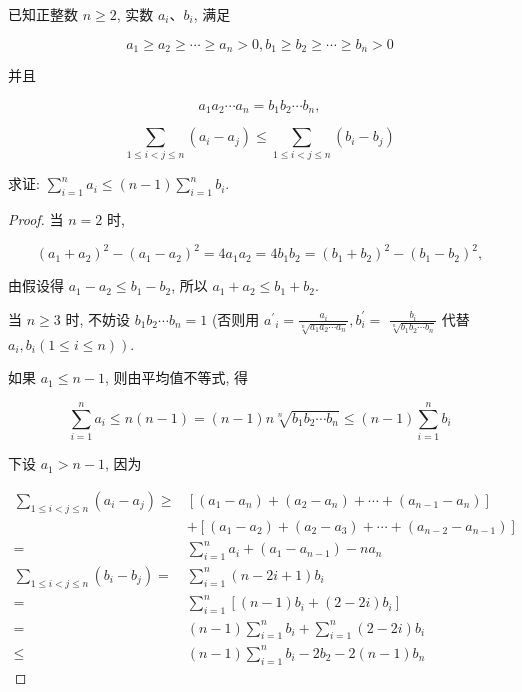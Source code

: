 \begin{example}
	已知正整数 $n \geqslant 2$, 实数 $a_{i} 、 b_{i}$, 满足
	
	$$
	a_{1} \geqslant a_{2} \geqslant \cdots \geqslant a_{n}>0, b_{1} \geqslant b_{2} \geqslant \cdots \geqslant b_{n}>0
	$$
	
	并且
	
	$$
	a_{1} a_{2} \cdots a_{n}=b_{1} b_{2} \cdots b_{n},
	$$
	
	$$
	\sum_{1 \leqslant i<j \leqslant n}\left(a_{i}-a_{j}\right) \leqslant \sum_{1 \leqslant i<j \leqslant n}\left(b_{i}-b_{j}\right)
	$$
	
	求证: $\sum_{i=1}^{n} a_{i} \leqslant(n-1) \sum_{i=1}^{n} b_{i}$.
\end{example}
\begin{proof}
	当 $n=2$ 时,
	
	$$
	\left(a_{1}+a_{2}\right)^{2}-\left(a_{1}-a_{2}\right)^{2}=4 a_{1} a_{2}=4 b_{1} b_{2}=\left(b_{1}+b_{2}\right)^{2}-\left(b_{1}-b_{2}\right)^{2},
	$$
	
	由假设得 $a_{1}-a_{2} \leqslant b_{1}-b_{2}$, 所以 $a_{1}+a_{2} \leqslant b_{1}+b_{2}$.
	
	当 $n \geqslant 3$ 时, 不妨设 $b_{1} b_{2} \cdots b_{n}=1$ (否则用 $a^{\prime}{ }_{i}=\frac{a_{i}}{\sqrt[n]{a_{1} a_{2} \cdots a_{n}}}, b_{i}^{\prime}=$ $\frac{b_{i}}{\sqrt[n]{b_{1} b_{2} \cdots b_{n}}}$ 代替 $\left.a_{i}, b_{i}(1 \leqslant i \leqslant n)\right)$.
	
	如果 $a_{1} \leqslant n-1$, 则由平均值不等式, 得
	
	$$
	\sum_{i=1}^{n} a_{i} \leqslant n(n-1)=(n-1) n \sqrt[n]{b_{1} b_{2} \cdots b_{n}} \leqslant(n-1) \sum_{i=1}^{n} b_{i}
	$$
	
	下设 $a_{1}>n-1$, 因为
	
	$$
	\begin{aligned}
	\sum_{1 \leqslant i<j \leqslant n}\left(a_{i}-a_{j}\right) \geqslant & {\left[\left(a_{1}-a_{n}\right)+\left(a_{2}-a_{n}\right)+\cdots+\left(a_{n-1}-a_{n}\right)\right] } \\
	& +\left[\left(a_{1}-a_{2}\right)+\left(a_{2}-a_{3}\right)+\cdots+\left(a_{n-2}-a_{n-1}\right)\right] \\
	= & \sum_{i=1}^{n} a_{i}+\left(a_{1}-a_{n-1}\right)-n a_{n} \\
	\sum_{1 \leqslant i<j \leqslant n}\left(b_{i}-b_{j}\right)= & \sum_{i=1}^{n}(n-2 i+1) b_{i} \\
	= & \sum_{i=1}^{n}\left[(n-1) b_{i}+(2-2 i) b_{i}\right] \\
	= & (n-1) \sum_{i=1}^{n} b_{i}+\sum_{i=1}^{n}(2-2 i) b_{i} \\
	\leqslant & (n-1) \sum_{i=1}^{n} b_{i}-2 b_{2}-2(n-1) b_{n}
	\end{aligned}
	$$
	

\end{proof}
